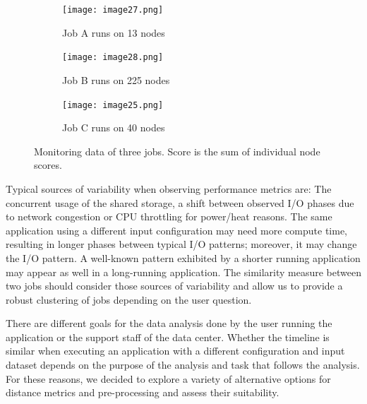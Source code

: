 \documentclass{jhps}
\begin{document}
\begin{figure}
        \centering
         \begin{subfigure}[t]{\textwidth}
           \texttt{[image: image27.png]}
           \caption{Job A runs on 13 nodes}
           \label{fig:typ_io:1}
         \end{subfigure}

        \begin{subfigure}[t]{\textwidth}
           \texttt{[image: image28.png]}
           \caption{Job B runs on 225 nodes}
           \label{fig:typ_io:2}
         \end{subfigure}

        \begin{subfigure}[t]{\textwidth}
          \texttt{[image: image25.png]}
          \caption{Job C runs on 40 nodes}
          \label{fig:typ_io:3}
        \end{subfigure}
\caption{Monitoring data of three jobs.
Score is the sum of individual node scores.}
         \label{fig:typ_io:all}
\end{figure}

Typical sources of variability when observing performance metrics are: The concurrent usage of the shared storage, a shift between observed I/O phases due to network congestion or CPU throttling for power/heat reasons.
The same application using a different input configuration may need more compute time, resulting in longer phases between typical I/O patterns; moreover, it may change the I/O pattern.
A well-known pattern exhibited by a shorter running application may appear as well in a long-running application.
The similarity measure between two jobs should consider those sources of variability and allow us to provide a robust clustering of jobs depending on the user question.

There are different goals for the data analysis done by the user running the application or the support staff of the data center.
Whether the timeline is similar when executing an application with a different configuration and input dataset depends on the purpose of the analysis and task that follows the analysis.
For these reasons, we decided to explore a variety of alternative options for distance metrics and pre-processing and assess their suitability.
\end{document}
